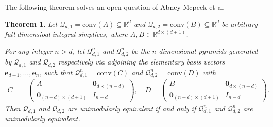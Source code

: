 \documentclass[reqno, 12pt]{article}
\newtheorem{thm}{Theorem}[section]
\theoremstyle{mydefinition}
\theoremstyle{myremark}
\numberwithin{algorithm}{section}
\begin{document}
The following theorem solves an open question \cite[Section 5]{Abney-Mcpeek} of Abney-Mcpeek et al.
\begin{thm}\label{Solve-OP-Simplices}
Let $\mathcal{Q}_{d,1} = \mathrm{conv}(A) \subseteq \mathbb{R}^d$ and $\mathcal{Q}_{d,2} = \mathrm{conv}(B) \subseteq \mathbb{R}^d$ be arbitrary  full-dimensioal  integral simplices, where $A,B\in \mathbb{R}^{d\times (d+1)}$.


For any integer $n > d$, let $\mathcal{Q}^n_{d,1}$ and $\mathcal{Q}^n_{d,2}$ be the $n$-dimensional pyramids generated by $\mathcal{Q}_{d,1}$ and $\mathcal{Q}_{d,2}$ respectively via adjoining the elementary basis vectors $\mathbf{e}_{d+1}, \dots, \mathbf{e}_n$, such that $\mathcal{Q}^n_{d,1} = \mathrm{conv}(C)$ and $\mathcal{Q}^n_{d,2} = \mathrm{conv}(D)$ with
\begin{align*}
C &= \begin{pmatrix}
            A & \mathbf{0}_{d\times(n-d)} \\
            \mathbf{0}_{(n-d)\times(d+1)} & I_{n-d}
          \end{pmatrix}, \quad
D = \begin{pmatrix}
            B & \mathbf{0}_{d\times(n-d)} \\
            \mathbf{0}_{(n-d)\times(d+1)} & I_{n-d}
          \end{pmatrix}.
\end{align*}
Then $\mathcal{Q}_{d,1}$ and $\mathcal{Q}_{d,2}$ are unimodularly equivalent if and only if $\mathcal{Q}^n_{d,1}$ and $\mathcal{Q}^n_{d,2}$ are unimodularly equivalent.
\end{thm}
\end{document}
